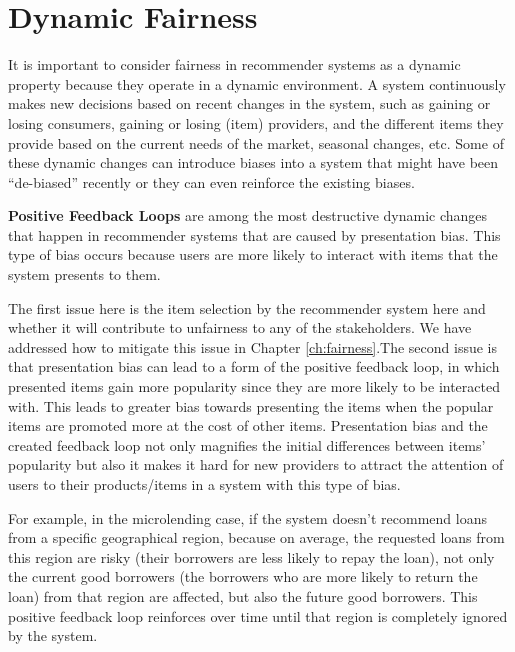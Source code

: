 \section{Dynamic Fairness}

    It is important to consider fairness in recommender systems as a dynamic property because they operate in a dynamic environment. A system continuously makes new decisions based on recent changes in the system, such as gaining or losing consumers, gaining or losing (item) providers, and the different items they provide based on the current needs of the market, seasonal changes, etc. Some of these dynamic changes can introduce biases into a system that might have been ``de-biased'' recently or they can even reinforce the existing biases. 
    
    \textbf{Positive Feedback Loops} are among the most destructive dynamic changes that happen in recommender systems \cite{o2016weapons} that are caused by presentation bias. This type of bias occurs because users are more likely to interact with items that the system presents to them. 
    
    The first issue here is the item selection by the recommender system here and whether it will contribute to unfairness to any of the stakeholders. We have addressed how to mitigate this issue in Chapter \ref{ch:fairness}.The second issue is that presentation bias can lead to a form of the positive feedback loop, in which presented items gain more popularity since they are more likely to be interacted with. This leads to greater bias towards presenting the items when the popular items are promoted more at the cost of other items. Presentation bias and the created feedback loop not only magnifies the initial differences between items' popularity but also it makes it hard for new providers to attract the attention of users to their products/items in a system with this type of bias.

    For example, in the microlending case, if the system doesn't recommend loans from a specific geographical region, because on average, the requested loans from this region are risky (their borrowers are less likely to repay the loan), not only the current good borrowers (the borrowers who are more likely to return the loan) from that region are affected, but also the future good borrowers. This positive feedback loop reinforces over time until that region is completely ignored by the system.
    
